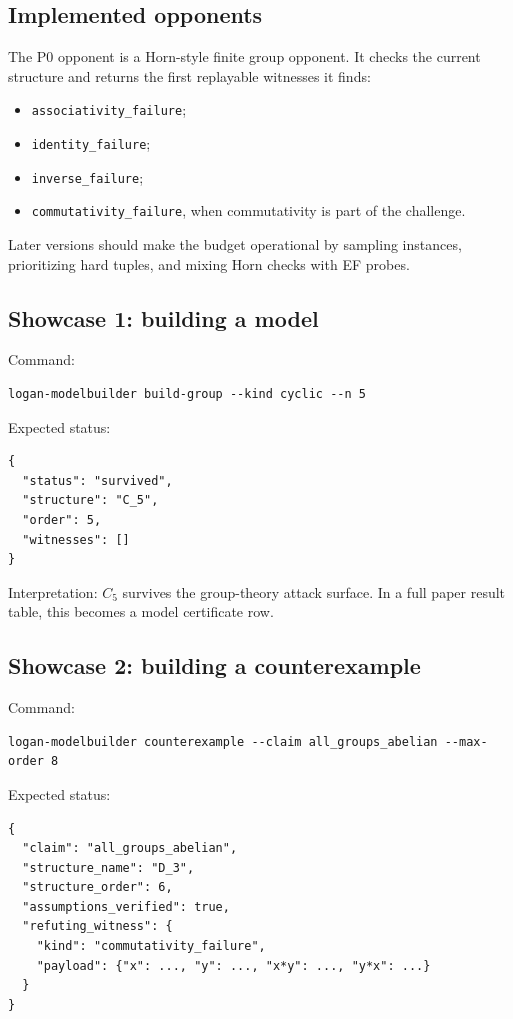 \documentclass[11pt]{article}
\begin{document}
\subsection{Implemented opponents}

The P0 opponent is a Horn-style finite group opponent.  It checks the current structure and returns the first replayable witnesses it finds:
\begin{itemize}[leftmargin=2em]
  \item \texttt{associativity\_failure};
  \item \texttt{identity\_failure};
  \item \texttt{inverse\_failure};
  \item \texttt{commutativity\_failure}, when commutativity is part of the challenge.
\end{itemize}

Later versions should make the budget operational by sampling instances, prioritizing hard tuples, and mixing Horn checks with EF probes.

\subsection{Showcase 1: building a model}

Command:
\begin{lstlisting}[basicstyle=\ttfamily\small]
logan-modelbuilder build-group --kind cyclic --n 5
\end{lstlisting}

Expected status:
\begin{lstlisting}[basicstyle=\ttfamily\small]
{
  "status": "survived",
  "structure": "C_5",
  "order": 5,
  "witnesses": []
}
\end{lstlisting}

Interpretation: \(C_5\) survives the group-theory attack surface.  In a full paper result table, this becomes a model certificate row.

\subsection{Showcase 2: building a counterexample}

Command:
\begin{lstlisting}[basicstyle=\ttfamily\small]
logan-modelbuilder counterexample --claim all_groups_abelian --max-order 8
\end{lstlisting}

Expected status:
\begin{lstlisting}[basicstyle=\ttfamily\small]
{
  "claim": "all_groups_abelian",
  "structure_name": "D_3",
  "structure_order": 6,
  "assumptions_verified": true,
  "refuting_witness": {
    "kind": "commutativity_failure",
    "payload": {"x": ..., "y": ..., "x*y": ..., "y*x": ...}
  }
}
\end{lstlisting}
\end{document}
